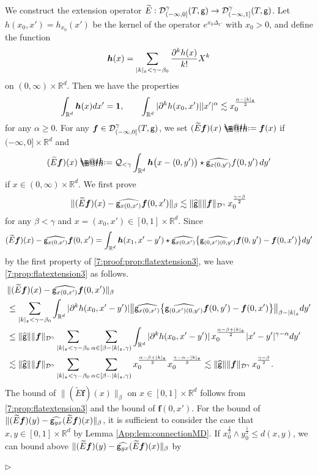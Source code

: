 \documentclass[10pt, reqno]{amsart}
\makeatletter
\numberwithin{subsection}{section}
\numberwithin{subsubsection}{subsection}
\numberwithin{equation}{section} %
\newenvironment{Dem}[1][\unskip]{%
    \begin{list}{\hspace{1.15cm}{\sf \textbf{{\small Proof #1 --}}}}{%
        \setlength{\topsep}{0pt}%
        \setlength{\leftmargin}{0pt}%
        \setlength{\rightmargin}{0pt}%
        \setlength{\listparindent}{0pt}%
        \setlength{\itemindent}{0pt}%
        \setlength{\parsep}{0pt}%
        \addtolength{\leftmargin}{0pt}%
        \addtolength{\rightmargin}{0pt}%
    } \item }{\hfill $\rhd$\end{list}\smallskip}
\theoremstyle{mystyle}
\theoremstyle{mystyle2}
\theoremstyle{mystyle3}
\newcommand{\bsf}{\boldsymbol{f}}
\newcommand{\bsh}{\boldsymbol{h}}
\newcommand{\mfs}{\mathfrak{s}}
\newcommand\bbR{\mathbb{R}}
\newcommand{\mcD}{\mathcal{D}}
\newcommand{\mcQ}{\mathcal{Q}}
\newcommand*{\defeq}{\mathrel{\rlap{%
                     \raisebox{0.3ex}{$\m@th\cdot$}}%
                     \raisebox{-0.3ex}{$\m@th\cdot$}}%
                     =}
\makeatother
\begin{document}
\begin{Dem}
We construct the extension operator $\widetilde{E}:\mcD_{(-\infty,0]}^\gamma(T,{\sf g})\to \mcD_{(-\infty,1]}^\gamma(T,{\sf g})$. Let $h(x_0,x')=h_{x_0}(x')$ be the kernel of the operator $e^{x_0\Delta_{x'}}$ with $x_0>0$, and define the function
$$
\bsh(x)=\sum_{|k|_{\frak{s}}<\gamma-\beta_0}\frac{\partial^kh(x)}{k!}X^k
$$
on $(0,\infty)\times\bbR^d$. Then we have the properties
\begin{align}\label{7:proof:prop:flatextension3}
\int_{\bbR^d}\bsh(x)dx'={\bf1},\qquad
\int_{\bbR^d}|\partial^kh(x_0,x')||x'|^\alpha\lesssim x_0^{\frac{\alpha-|k|_\mfs}2}
\end{align}
for any $\alpha\ge0$.
For any $\bsf\in\mcD_{(-\infty,0]}^\gamma(T,{\sf g})$, we set $(\widetilde{E}\bsf)(x)\defeq \bsf(x)$ if $(-\infty,0]\times\bbR^d$ and
$$
(\widetilde{E}\bsf)(x) \defeq  \mcQ_{<\gamma}\int_{\bbR^d}\bsh\big(x-(0,y')\big)\star\widehat{{\sf g}_{x(0,y')}}f(0,y')\,dy'
$$
if $x\in(0,\infty)\times\bbR^d$. 
We first prove
\begin{align}
\label{7:prop:flatextension3}
\|(\widetilde{E}\bsf)(x)-\widehat{{\sf g}_{x(0,x')}}\bsf(0,x')\|_\beta
\lesssim\|\widehat{\sf g}\|\|\bsf\|_{\mcD^\gamma}\, x_0^{\frac{\gamma-\beta}2}
\end{align}
for any $\beta<\gamma$ and $x=(x_0,x')\in[0,1]\times\bbR^d$. Since
$$
(\widetilde{E}\bsf)(x)-\widehat{{\sf g}_{x(0,x')}}\bsf(0,x')
=\int_{\bbR^d}\bsh(x_1,x'-y')\star\widehat{{\sf g}_{x(0,x')}}
\big\{\widehat{{\sf g}_{(0,x')(0,y')}}\bsf(0,y')-\bsf(0,x')\big\}dy'
$$
by the first property of \eqref{7:proof:prop:flatextension3}, we have \eqref{7:prop:flatextension3} as follows.
\begin{align*}
&\|(\widetilde{E}\bsf)(x)-\widehat{{\sf g}_{x(0,x')}}\bsf(0,x')\|_\beta\\
%
&\le\sum_{|k|_\mfs<\gamma-\beta_0}\int_{\bbR^d}|\partial^kh(x_0,x'-y')|
\big\|\widehat{{\sf g}_{x(0,x')}}
\big\{\widehat{{\sf g}_{(0,x')(0,y')}}\bsf(0,y')-\bsf(0,x')\big\}\big\|_{\beta-|k|_\mfs}dy'\\
%
&\le\|\widehat{\sf g}\|\|\bsf\|_{\mcD^\gamma}\sum_{|k|_\mfs<\gamma-\beta_0}
\sum_{\alpha\in[\beta-|k|_\mfs,\gamma)}
\int_{\bbR^d}|\partial^kh(x_0,x'-y')|\,
x_0^{\frac{\alpha-\beta+|k|_\mfs}2}|x'-y'|^{\gamma-\alpha}dy'\\
%
&\lesssim\|\widehat{\sf g}\|\|\bsf\|_{\mcD^\gamma}\sum_{|k|_\mfs<\gamma-\beta_0}
\sum_{\alpha\in[\beta-|k|_\mfs,\gamma)}x_0^{\frac{\alpha-\beta+|k|_\mfs}2}x_0^{\frac{\gamma-\alpha-|k|_\mfs}2}
\lesssim\|\widehat{\sf g}\|\|\bsf\|_{\mcD^\gamma}\,x_0^{\frac{\gamma-\beta}2}.
\end{align*}
The bound of $\big\|(\widetilde{E}\bsf)(x)\big\|_\beta$ on $x\in[0,1]\times\bbR^d$ follows from \eqref{7:prop:flatextension3} and the bound of $\bsf(0,x')$.
For the bound of $\|(\widetilde{E}\bsf)(y)-\widehat{{\sf g}_{yx}}(\widetilde{E}\bsf)(x)\|_\beta$, it is sufficient to consider the case that $x,y\in[0,1]\times\bbR^d$ by Lemma \ref{App:lem:connectionMD}. If $x_0^{\frac12}\wedge y_0^{\frac12}\le d(x,y)$, we can bound above $\|(\widetilde{E}\bsf)(y)-\widehat{{\sf g}_{yx}}(\widetilde{E}\bsf)(x)\|_\beta$ by 


\end{Dem}
\end{document}
